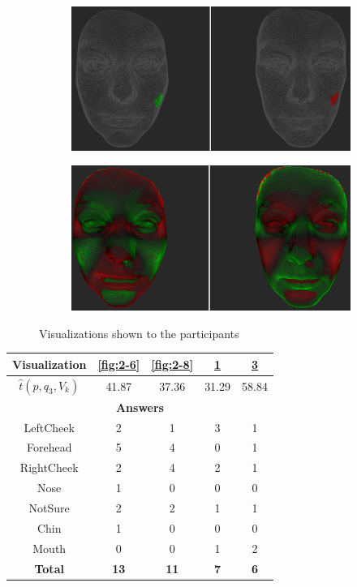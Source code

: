 \begin{figure}[h]
\begin{subfigure}{0.4\textwidth}
\includegraphics[width=\textwidth]{./screenshots/pair5.PNG}
\caption{}
\label{fig:2-5}
\end{subfigure}
\quad
\begin{subfigure}{0.4\textwidth}
\includegraphics[width=\textwidth]{./screenshots/pair7.PNG}
\caption{}
\label{fig:2-7}
\end{subfigure}
\caption{Visualizations shown to the participants}
\end{figure}
\medskip

\begin{center}
\begin{tabular}{| c | c | c | c | c |}
	\hline
	Visualization & \ref{fig:2-6} & \ref{fig:2-8} & \ref{fig:2-5} & \ref{fig:2-7}\\ \hline
	\(\widehat{t}(p, q_3, V_k)\) & 41.87 & 37.36 & 31.29 & 58.84\\ \hline
	\multicolumn{5}{|c|}{\bf Answers} \\ \hline
	LeftCheek & 2 & 1 & 3 & 1\\ \hline
	Forehead & 5 & 4 & 0 & 1\\ \hline
	RightCheek & 2 & 4 & 2 & 1\\ \hline
	Nose & 1 & 0 & 0 & 0\\ \hline
	NotSure & 2 & 2 & 1 & 1\\ \hline
	Chin & 1 & 0 & 0 & 0\\ \hline
	Mouth & 0 & 0 & 1 & 2\\ \hline
	{\bf Total} & {\bf 13} & {\bf 11} & {\bf 7} & {\bf 6}\\ \hline
\end{tabular}
\end{center}
\clearpage

